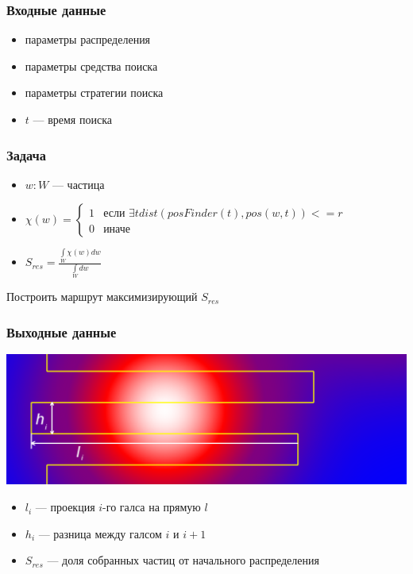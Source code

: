 \documentclass{beamer} %
\theoremstyle{definition} %
\begin{document}
\begin{frame}
  \frametitle{Входные данные}
\begin{itemize}
\item параметры распределения
\item параметры средства поиска
\item параметры стратегии поиска
\item $t$ --- время поиска
\end{itemize}
\end{frame}

\begin{frame}
  \frametitle{Задача}
\begin{itemize}
  \item {$w : W$ --- частица}
  \item {$\chi(w) = 
	\left\{
		\begin{array}{ll}
			1 & \mbox{если } {\exists t {dist(posFinder(t), pos(w, t)) <= r}}\\
			0 & \mbox{иначе }
		\end{array}
	\right.$
        }
  \item {$S_{res}=\frac{\int\limits_W{\chi(w)dw}}{\int\limits_Wdw}$}
\end{itemize}
  Построить маршрут максимизирующий $S_{res}$
\end{frame}

\begin{frame}
  \frametitle{Выходные данные}
\includegraphics[width=\textwidth]{pics/pic06-lh.png}
\begin{itemize}
  \item $l_i$ --- проекция $i$-го галса на прямую $l$
  \item $h_i$ --- разница между галсом $i$ и $i+1$
  \item $S_{res}$ --- доля собранных частиц от начального распределения
\end{itemize}

\end{frame}
\end{document}
